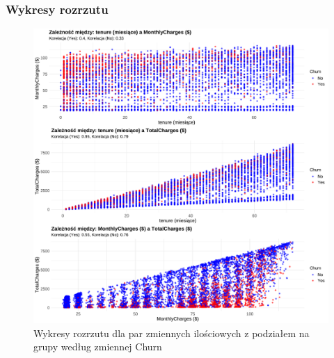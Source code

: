 \documentclass[12pt, a4paper]{article}\usepackage[]{graphicx}\usepackage[]{xcolor}
\makeatletter
\def\maxwidth{ %
  \ifdim\Gin@nat@width>\linewidth
    \linewidth
  \else
    \Gin@nat@width
  \fi
}
\newenvironment{knitrout}{}{} %
\makeatother
\begin{document}
\subsubsection{Wykresy rozrzutu}
\begin{knitrout}
\color{fgcolor}\begin{figure}[H]

{\centering \includegraphics[width=\maxwidth]{figure/scatterploty-churn-1} 

}

\caption[Wykresy rozrzutu dla par zmiennych ilościowych z podziałem na grupy według zmiennej Churn]{Wykresy rozrzutu dla par zmiennych ilościowych z podziałem na grupy według zmiennej Churn}\label{fig:scatterploty-churn}
\end{figure}

\end{knitrout}
\end{document}
